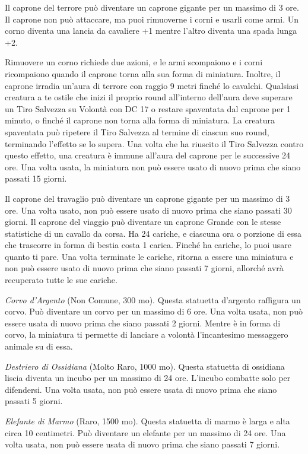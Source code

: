 \begin{multicols}{2}
	Il caprone del terrore può diventare un caprone gigante per un massimo di 3 ore. Il caprone non può attaccare, ma puoi rimuoverne i corni e usarli come armi. Un corno diventa una lancia da cavaliere +1 mentre l'altro diventa una spada lunga +2.

	Rimuovere un corno richiede due azioni, e le armi scompaiono e i corni ricompaiono quando il caprone torna alla sua forma di miniatura. Inoltre, il caprone irradia un'aura di terrore con raggio 9 metri finché lo cavalchi. Qualsiasi creatura a te ostile che inizi il proprio round all'interno dell'aura deve superare un Tiro Salvezza su Volontà con DC 17 o restare
	spaventata dal caprone per 1 minuto, o finché il caprone non torna alla forma di miniatura. La creatura spaventata può ripetere il Tiro Salvezza al termine di ciascun suo round, terminando l'effetto se lo supera. Una volta che ha riuscito il Tiro Salvezza contro questo effetto, una creatura è immune all'aura del caprone per le successive 24 ore. Una volta usata, la miniatura non può essere usato di nuovo prima che siano passati 15 giorni.

	Il caprone del travaglio può diventare un caprone gigante per un massimo di 3 ore. Una volta usato, non può essere usato di nuovo prima che siano passati 30 giorni.
	Il caprone del viaggio può diventare un caprone Grande con le stesse statistiche di un cavallo da corsa. Ha 24 cariche, e ciascuna ora o porzione di essa che trascorre in forma di bestia costa 1 carica. Finché ha cariche, lo puoi usare quanto ti pare. Una volta terminate le cariche, ritorna a essere una miniatura e non può essere usato di nuovo prima che siano passati 7 giorni, allorché avrà recuperato tutte le sue cariche.

	\textit{Corvo d'Argento} (Non Comune, 300 mo). Questa statuetta d'argento raffigura un corvo. Può diventare un corvo per un massimo di 6 ore. Una volta usata, non può essere usata di nuovo prima che siano passati 2 giorni. Mentre è in forma di corvo, la miniatura ti permette di lanciare a volontà l'incantesimo messaggero animale su di essa.

	\textit{Destriero di Ossidiana} (Molto Raro, 1000 mo). Questa statuetta di ossidiana liscia diventa un incubo per un massimo di 24 ore. L'incubo combatte solo per difendersi. Una volta usata, non può essere usata di nuovo prima che siano passati 5 giorni.

	\textit{Elefante di Marmo} (Raro, 1500 mo). Questa statuetta di marmo è larga e alta circa 10 centimetri. Può diventare un elefante per un massimo di 24 ore. Una volta usata, non può essere usata di nuovo prima che siano passati 7 giorni.


\end{multicols}
